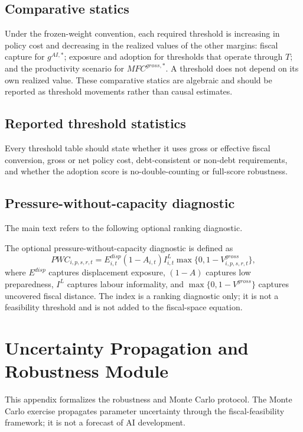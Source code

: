 \documentclass[11pt,a4paper]{article}
\begin{document}
\subsection{Comparative statics}

Under the frozen-weight convention, each required threshold is increasing in policy cost and decreasing in the realized values of the other margins: fiscal capture for $g^{AI,*}$; exposure and adoption for thresholds that operate through $T$; and the productivity scenario for $MFC^{gross,*}$. A threshold does not depend on its own realized value. These comparative statics are algebraic and should be reported as threshold movements rather than causal estimates.

\subsection{Reported threshold statistics}

Every threshold table should state whether it uses gross or effective fiscal conversion, gross or net policy cost, debt-consistent or non-debt requirements, and whether the adoption score is no-double-counting or full-score robustness.

\subsection{Pressure-without-capacity diagnostic}

The main text refers to the following optional ranking diagnostic.

The optional pressure-without-capacity diagnostic is defined as
\begin{equation}\label{eq:pwc_index_v22}
    PWC_{i,p,s,r,t}=E^{disp}_{i,t}(1-A_{i,t})I^L_{i,t}\max\{0,1-V^{gross}_{i,p,s,r,t}\},
\end{equation}
where $E^{disp}$ captures displacement exposure, $(1-A)$ captures low preparedness, $I^L$ captures labour informality, and $\max\{0,1-V^{gross}\}$ captures uncovered fiscal distance. The index is a ranking diagnostic only; it is not a feasibility threshold and is not added to the fiscal-space equation.


\section{Uncertainty Propagation and Robustness Module}\label{app:uncertainty_module}

This appendix formalizes the robustness and Monte Carlo protocol. The Monte Carlo exercise propagates parameter uncertainty through the fiscal-feasibility framework; it is not a forecast of AI development.
\end{document}
